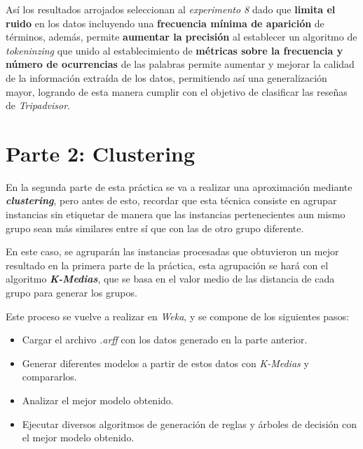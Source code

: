 \documentclass[12pt,a4paper, xcolor=table]{article}
\begin{document}
    \vspace{3mm}
    
    Así los resultados arrojados seleccionan al \textit{experimento 8} dado que \textbf{limita el ruido} en los datos incluyendo una\textbf{ frecuencia mínima de aparición} de términos, además, permite \textbf{aumentar la precisión} al establecer un algoritmo de \textit{tokeninzing} que unido al establecimiento de \textbf{métricas sobre la frecuencia y número de ocurrencias} de las palabras permite aumentar y mejorar la calidad de la información extraída de los datos, permitiendo así una generalización mayor, logrando de esta manera cumplir con el objetivo de clasificar las reseñas de \textit{Tripadvisor}.

\newpage

\section{Parte 2: Clustering}

En la segunda parte de esta práctica se va a realizar una aproximación mediante \textbf{\textit{clustering}}, pero antes de esto, recordar que esta técnica consiste en agrupar instancias sin etiquetar de manera que las instancias pertenecientes aun mismo grupo sean más similares entre sí que con las de otro grupo diferente. 

\vspace{2mm}

En este caso, se agruparán las instancias procesadas que obtuvieron un mejor resultado en la primera parte de la práctica, esta agrupación se hará con el algoritmo \textbf{\textit{K-Medias}}, que se basa en el valor medio de las distancia de cada grupo para generar los grupos. 

\vspace{1mm}

Este proceso se vuelve a realizar en \textit{Weka}, y se compone de los siguientes pasos:

\begin{itemize}
    \item Cargar el archivo \textit{.arff} con los datos generado en la parte anterior.
    \item Generar diferentes modelos a partir de estos datos con \textit{K-Medias} y compararlos.
    \item Analizar el mejor modelo obtenido.
    \item Ejecutar diversos algoritmos de generación de reglas y árboles de decisión con el mejor modelo obtenido.
\end{itemize}
\end{document}
